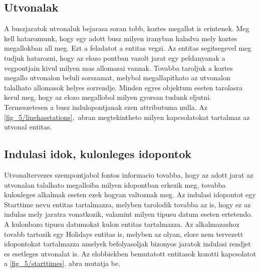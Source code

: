 \subsection*{Utvonalak}
\label{linehasstationsdetails}
A buszjaratok utvonaluk bejarasa soran tobb, koztes megallot is erintenek. 
Meg kell hataroznunk, hogy egy adott busz milyen iranyban haladva mely koztes megallokban all meg. 
Ezt a feladatot a  entitas vegzi. 
Az entitas segitsegevel meg tudjuk hatarozni, hogy az elozo pontban vazolt jarat egy peldanyanak a vegpontjain kivul milyen mas allomasai vannak. 
Tovabba taroljuk a koztes megallo utvonalon beluli sorszamat, melybol megallapithato az utvonalon talalhato allomasok helyes sorrendje. 
Minden egyes objektum eseten tarolasra kerul meg, hogy az elozo megallobol milyen gyorsan tudunk eljutni. 
Termeszetesen a busz indulopontjanak ezen attributuma nulla. 
Az \ref{fig_5/linehasstations}.\ abran megtekintheto milyen kapcsolatokat tartalmaz az utvonal entitas. 
\subsection*{Indulasi idok, kulonleges idopontok}
\label{starttimes}
Utvonaltervezes szempontjabol fontos informacio tovabba, hogy az adott jarat az utvonalan talalhato megalloiba milyen idopontban erkezik meg, tovabba kulonleges alkalmak eseten ezek hogyan valtoznak meg. 
Az indulasi idopontot egy Starttime nevu entitas tartalmazza, melyben tarolodik tovabba az is, hogy ez az indulas mely jaratra vonatkozik, valamint milyen tipusu datum eseten ertetendo. 
A kulonbozo tipusu datumokat kulon entitas tartalmazza. 
Az alkalmazashoz tovabb tartozik egy Holidays entitas is, melyben az olyan, elore nem tervezett idopontokat tartalmazza amelyek befolyasoljak bizonyos jaratok indulasi rendjet es esetleges utvonalat is. 
Az elobbiekben bemutatott entitasok kozotti kapcsolatot a \ref{fig_5/starttimes}. abra mutatja be. 


